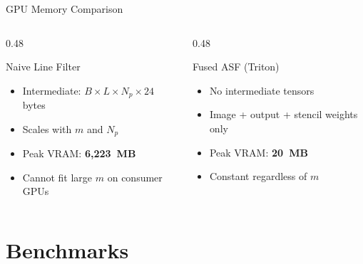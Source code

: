 \documentclass[10pt, aspectratio=169]{beamer}
\begin{document}
\begin{frame}{GPU Memory Comparison}
  \begin{columns}[T]
    \begin{column}{0.48\textwidth}
      \begin{alertblock}{Naive Line Filter}
        \begin{itemize}
          \item Intermediate: $B \times L \times N_p \times 24$ bytes
          \item Scales with $m$ and $N_p$
          \item Peak VRAM: \textbf{6,223~MB}
          \item Cannot fit large $m$ on consumer GPUs
        \end{itemize}
      \end{alertblock}
    \end{column}
    \begin{column}{0.48\textwidth}
      \begin{exampleblock}{Fused ASF (Triton)}
        \begin{itemize}
          \item No intermediate tensors
          \item Image + output + stencil weights only
          \item Peak VRAM: \textbf{20~MB}
          \item Constant regardless of $m$
        \end{itemize}
      \end{exampleblock}
    \end{column}
  \end{columns}

  \vspace{0.8em}
  \begin{center}
  \end{center}
\end{frame}

\section{Benchmarks}
\end{document}
